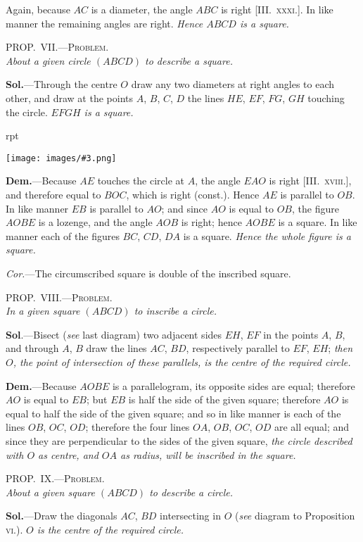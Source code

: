 \documentclass[oneside]{book}
\newcounter{wrapwidth}
\newcommand\myprop[2]{
\bigskip\Needspace*{4\baselineskip}\begin{center}\textsc{#1}\\\medskip\emph{#2}\par\end{center}
}
\newcommand\imgflow[3]{
\setcounter{wrapwidth}{#1}
\begin{wrapfigure}[#2]{r}{\value{wrapwidth}pt}
\begin{center}
\vspace{-0.3in}
\texttt{[image: images/\#3.png]}
\end{center}
\end{wrapfigure}
}
\begin{document}
Again, because $AC$ is a diameter, the angle $ABC$
is right [\textsc{III\@.~xxxi.}]. In like manner the remaining
angles are right. \emph{Hence $ABCD$ is a square.}

\myprop{PROP\@.~VII\@.---Problem.}{About a given circle $(ABCD)$ to describe a square.}

\textbf{Sol.}---Through the centre $O$ draw any two diameters
at right angles to each other, and draw at the points
$A$, $B$, $C$, $D$ the lines $HE$, $EF$, $FG$, $GH$ touching the
circle. \emph{$EFGH$ is a square.}

\imgflow{120}{10}{f161}

\textbf{Dem.}---Because $AE$ touches the circle at $A$, the angle
$EAO$ is right [\textsc{III\@.~xviii.}], and
therefore equal to $BOC$, which
is right (const.). Hence $AE$ is
parallel to $OB$. In like manner
$EB$ is parallel to $AO$; and since
$AO$ is equal to $OB$, the figure
$AOBE$ is a lozenge, and the angle
$AOB$ is right; hence $AOBE$ is a
square. In like manner each of
the figures $BC$, $CD$, $DA$ is a
square. \emph{Hence the whole figure is a square.}

\emph{Cor.}---The circumscribed square is double of the inscribed
square.

\myprop{PROP\@.~VIII\@.---Problem.}{In a given square $(ABCD)$ to inscribe a circle.}

\textbf{Sol}.---Bisect (\emph{see} last diagram) two adjacent sides
$EH$, $EF$ in the points $A$, $B$, and through $A$, $B$ draw
the lines $AC$, $BD$, respectively parallel to $EF$, $EH$;
\emph{then $O$, the point of intersection of these parallels, is the
centre of the required circle.}

\textbf{Dem.}---Because $AOBE$ is a parallelogram, its opposite
sides are equal; therefore $AO$ is equal to $EB$; but
$EB$ is half the side of the given square; therefore $AO$
is equal to half the side of the given square; and so in
like manner is each of the lines $OB$, $OC$, $OD$; therefore
the four lines $OA$, $OB$, $OC$, $OD$ are all equal; and since
they are perpendicular to the sides of the given square,
\emph{the circle described with $O$ as centre, and $OA$ as radius,
will be inscribed in the square.}

\myprop{PROP\@.~IX\@.---Problem.}{About a given square\label{circlesquare} $(ABCD)$ to describe a circle.}

\textbf{Sol.}---Draw the diagonals $AC$, $BD$ intersecting in $O$
(\emph{see} diagram to Proposition \textsc{vi.}). \emph{$O$ is the centre of the
required circle.}
\end{document}
